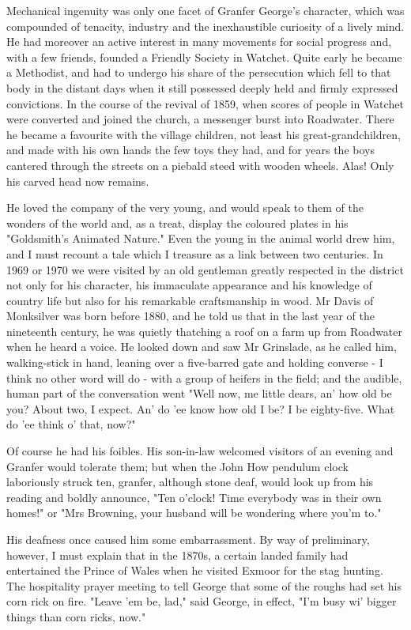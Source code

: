 Mechanical ingenuity was only one facet of Granfer George's character, which was compounded of tenacity, industry and the inexhaustible curiosity of a lively mind. He had moreover an active interest in many movements for social progress and, with a few friends, founded a Friendly Society in Watchet. Quite early he became a Methodist, and had to undergo his share of the persecution which fell to that body in the distant days when it still possessed deeply held and firmly expressed convictions. In the course of the revival of 1859, when scores of people in Watchet were converted and joined the church, a messenger burst into Roadwater. There he became a favourite with the village children, not least his great-grandchildren, and made with his own hands the few toys they had, and for years the boys cantered through the streets on a piebald steed with wooden wheels. Alas! Only his carved head now remains.

He loved the company of the very young, and would speak to them of the wonders of the world and, as a treat, display the coloured plates in his "Goldsmith’s Animated Nature." Even the young in the animal world drew him, and I must recount a tale which I treasure as a link between two centuries. In 1969 or 1970 we were visited by an old gentleman greatly respected in the district not only for his character, his immaculate appearance and his knowledge of country life but also for his remarkable craftsmanship in wood. Mr Davis of Monksilver was born before 1880, and he told us that in the last year of the nineteenth century, he was quietly thatching a roof on a farm up from Roadwater when he heard a voice. He looked down and saw Mr Grinslade, as he called him, walking-stick in hand, leaning over a five-barred gate and holding converse - I think no other word will do - with a group of heifers in the field; and the audible, human part of the conversation went "Well now, me little dears, an' how old be you? About two, I expect. An' do 'ee know how old I be? I be eighty-five. What do 'ee think o’ that, now?"

Of course he had his foibles. His son-in-law welcomed visitors of an evening and Granfer would tolerate them; but when the John How pendulum clock laboriously struck ten, granfer, although stone deaf, would look up from his reading and boldly announce, "Ten o'clock! Time everybody was in their own homes!" or "Mrs Browning, your husband will be wondering where you'm to."

His deafness once caused him some embarrassment. By way of preliminary, however, I must explain that in the 1870s, a certain landed family had entertained the Prince of Wales when he visited Exmoor for the stag hunting. The hospitality prayer meeting to tell George that some of the roughs had set his corn rick on fire. "Leave 'em be, lad," said George, in effect, "I'm busy wi' bigger things than corn ricks, now."

